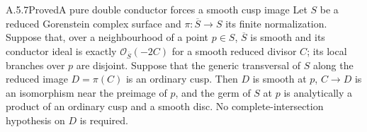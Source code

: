 
\begin{statement}{A.5.7}{Proved}{A pure double conductor forces a smooth cusp image}
Let $S$ be a reduced Gorenstein complex surface and
$\pi:\overline S\to S$ its finite normalization.
Suppose that, over a neighbourhood of a point $p\in S$,
$\overline S$ is smooth and its conductor ideal is exactly
$\mathcal O_{\overline S}(-2C)$ for a smooth reduced
divisor $C$; its local branches over $p$ are disjoint.
Suppose that the generic transversal of $S$ along the
reduced image $D=\pi(C)$ is an ordinary cusp.
Then $D$ is smooth at $p$, $C\to D$ is an isomorphism
near the preimage of $p$, and the germ of $S$ at $p$ is
analytically a product of an ordinary cusp and a smooth disc.
No complete-intersection hypothesis on $D$ is required.
\end{statement}

